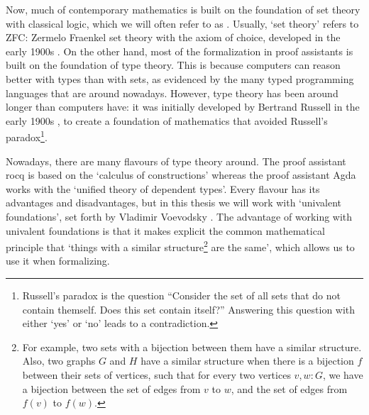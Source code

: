 Now, much of contemporary mathematics is built on the foundation of set theory with classical logic, which we will often refer to as . Usually, `set theory' refers to ZFC: Zermelo Fraenkel set theory with the axiom of choice, developed in the early 1900s \autocite{Zermelo-set-theory}. On the other hand, most of the formalization in proof assistants is built on the foundation of type theory. This is because computers can reason better with types than with sets, as evidenced by the many typed programming languages that are around nowadays. However, type theory has been around longer than computers have: it was initially developed by Bertrand Russell in the early 1900s \autocite[][Appendix B]{Russell-type-theory}, to create a foundation of mathematics that avoided Russell's paradox\footnote{Russell's paradox is the question ``Consider the set of all sets that do not contain themself. Does this set contain itself?'' Answering this question with either `yes' or `no' leads to a contradiction.}.

Nowadays, there are many flavours of type theory around. The proof assistant rocq is based on the `calculus of constructions' whereas the proof assistant Agda works with the `unified theory of dependent types'. Every flavour has its advantages and disadvantages, but in this thesis we will work with `univalent foundations', set forth by Vladimir Voevodsky \autocite{voevodsky-univalent-foundations}. The advantage of working with univalent foundations is that it makes explicit the common mathematical principle that `things with a similar structure\footnote{For example, two sets with a bijection between them have a similar structure. Also, two graphs $ G $ and $ H $ have a similar structure when there is a bijection $ f $ between their sets of vertices, such that for every two vertices $ v, w : G $, we have a bijection between the set of edges from $ v $ to $ w $, and the set of edges from $ f(v) $ to $ f(w) $.} are the same', which allows us to use it when formalizing.


